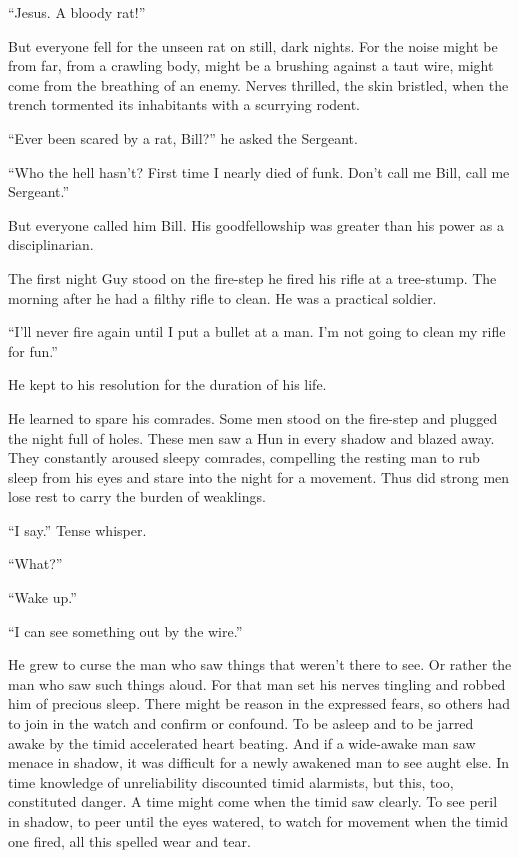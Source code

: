 ``Jesus. A bloody rat!''

But everyone fell for the unseen rat on still, dark nights. For the noise might be from far, from a crawling body, might be a brushing against a taut wire, might come from the breathing of an enemy. Nerves thrilled, the skin bristled, when the trench tormented its inhabitants with a scurrying rodent.

``Ever been scared by a rat, Bill?'' he asked the Sergeant.

``Who the hell hasn't? First time I nearly died of funk. Don't call me Bill, call me Sergeant.''

But everyone called him Bill. His goodfellowship was greater than his power as a disciplinarian.

The first night Guy stood on the fire-step he fired his rifle at a tree-stump. The morning after he had a filthy rifle to clean. He was a practical soldier.

``I'll never fire again until I put a bullet at a man. I'm not going to clean my rifle for fun.''

He kept to his resolution for the duration of his life.

He learned to spare his comrades. Some men stood on the fire-step and plugged the night full of holes. These men saw a Hun in every shadow and blazed away. They constantly aroused sleepy comrades, compelling the resting man to rub sleep from his eyes and stare into the night for a movement. Thus did strong men lose rest to carry the burden of weaklings.

``I say.'' Tense whisper.

``What?''

``Wake up.''

``I can see something out by the wire.''

He grew to curse the man who saw things that weren't there to see. Or rather the man who saw such things aloud. For that man set his nerves tingling and robbed him of precious sleep. There might be reason in the expressed fears, so others had to join in the watch and confirm or confound. To be asleep and to be jarred awake by the timid accelerated heart beating. And if a wide-awake man saw menace in shadow, it was difficult for a newly awakened man to see aught else. In time knowledge of unreliability discounted timid alarmists, but this, too, constituted danger. A time might come when the timid saw clearly. To see peril in shadow, to peer until the eyes watered, to watch for movement when the timid one fired, all this spelled wear and tear.

